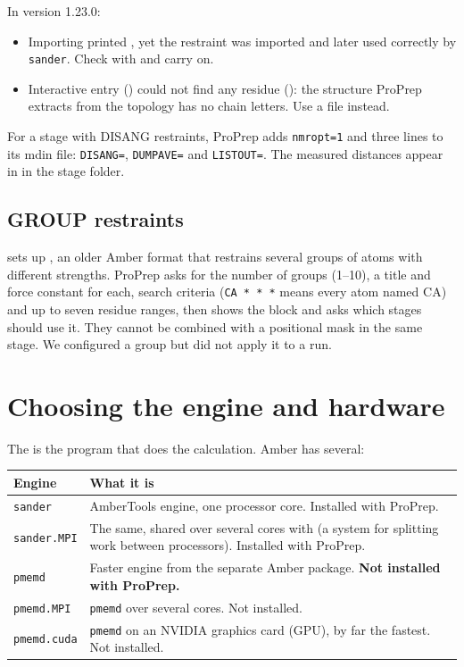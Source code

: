 \begin{watchout}
In version 1.23.0:
\begin{itemize}
  \item Importing printed ,
        yet the restraint was imported and later used correctly by
        \texttt{sander}. Check with  and carry on.
  \item Interactive entry () could not find any residue (): the structure ProPrep extracts from the topology has
        no chain letters. Use a file instead.
\end{itemize}
\end{watchout}

For a stage with DISANG restraints, ProPrep adds \texttt{nmropt=1} and
three lines to its mdin file:
\texttt{DISANG=}, \texttt{DUMPAVE=} and \texttt{LISTOUT=}. The measured
distances appear in  in the stage folder.

\subsection{GROUP restraints}

 sets up , an older Amber format that restrains
several groups of atoms with different strengths. ProPrep asks for the number
of groups (1--10), a title and force constant for each, search criteria
(\texttt{CA * * *} means every atom named CA) and up to seven residue ranges,
then shows the block and asks which stages should use it. They cannot be
combined with a positional mask in the same stage. We configured a group but
did not apply it to a run.

\section{Choosing the engine and hardware}\label{sec:runningmd-engine}

The  is the program that does the calculation. Amber has
several:

\begin{tabularx}{\linewidth}{@{}lL@{}}
\toprule
\textbf{Engine} & \textbf{What it is} \\
\midrule
\texttt{sander} & AmberTools engine, one processor core. Installed with
  ProPrep. \\
\texttt{sander.MPI} & The same, shared over several cores with 
  (a system for splitting work between processors). Installed with ProPrep. \\
\texttt{pmemd} & Faster engine from the separate Amber package. \textbf{Not
  installed with ProPrep.} \\
\texttt{pmemd.MPI} & \texttt{pmemd} over several cores. Not installed. \\
\texttt{pmemd.cuda} & \texttt{pmemd} on an NVIDIA graphics card (GPU), by far
  the fastest. Not installed. \\
\bottomrule
\end{tabularx}

